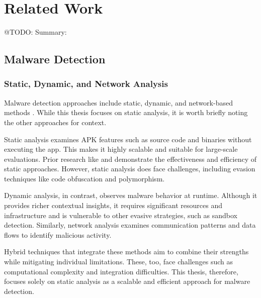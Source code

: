 \chapter{Related Work} %

\label{related_work} %

@TODO:  Summary:

\section{Malware Detection}

\subsection{Static, Dynamic, and Network Analysis}
Malware detection approaches include static, dynamic, and network-based methods \cite{vorlesung}.
While this thesis focuses on static analysis, it is worth briefly noting the other approaches for context.

Static analysis examines APK features such as source code and binaries without executing the app.
This makes it highly scalable and suitable for large-scale evaluations.
Prior research like \cite{drebin} and \cite{detectbert} demonstrate the effectiveness and efficiency of static approaches.
However, static analysis does face challenges, including evasion techniques like code obfuscation and polymorphism.

Dynamic analysis, in contrast, observes malware behavior at runtime.
Although it provides richer contextual insights, it requires significant resources and infrastructure and is vulnerable to other evasive strategies, such as sandbox detection.
Similarly, network analysis examines communication patterns and data flows to identify malicious activity.

Hybrid techniques that integrate these methods aim to combine their strengths while mitigating individual limitations.
These, too, face challenges such as computational complexity and integration difficulties.
This thesis, therefore, focuses solely on static analysis as a scalable and efficient approach for malware detection.


